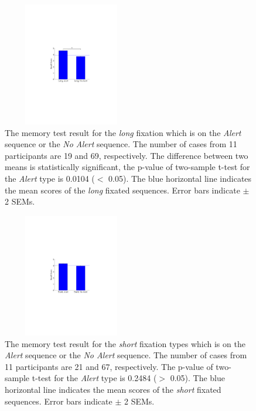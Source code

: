 \documentclass{kcc}
\begin{document}
\begin{figure}
  \centerline{\includegraphics[width=60mm,height=54mm,trim=65mm 103mm 68mm 100mm]{./eps/memtest_long.pdf}}
  \caption{The memory test result for the \textit{long} fixation which is on the \textit{Alert} sequence or the \textit{No Alert} sequence. The number of cases from 11 participants are 19 and 69, respectively. The difference between two means is statistically significant, the p-value of two-sample t-test for the \textit{Alert} type is 0.0104 ($<$ 0.05). The blue horizontal line indicates the mean scores of the \textit{long} fixated sequences. Error bars indicate $\pm$ 2 SEMs.}
  \label{fig:memtest-long}
\end{figure}

\begin{figure}
  \centerline{\includegraphics[width=60mm,height=54mm,trim=65mm 103mm 68mm 100mm]{./eps/memtest_short.pdf}}
  \caption{The memory test result for the \textit{short} fixation types which is on the \textit{Alert} sequence or the \textit{No Alert} sequence. The number of cases from 11 participants are 21 and 67, respectively. The p-value of two-sample t-test for the \textit{Alert} type is 0.2484 ($>$ 0.05). The blue horizontal line indicates the mean scores of the \textit{short} fixated sequences. Error bars indicate $\pm$ 2 SEMs.}
  \label{fig:memtest-short}
\end{figure}
\end{document}
